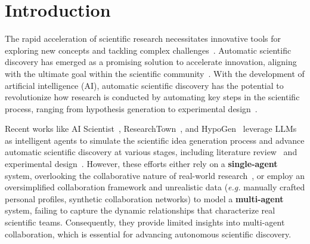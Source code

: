 \documentclass[11pt]{article}
\begin{document}
\section{Introduction}
\label{sec:intro}
The rapid acceleration of scientific research necessitates innovative tools for exploring new concepts and tackling complex challenges~\citep{park2023papers}. Automatic scientific discovery has emerged as a promising solution to accelerate innovation, aligning with the ultimate goal within the scientific community~\citep{langley1987scientific}.
With the development of artificial intelligence (AI), automatic scientific discovery has the potential to revolutionize how research is conducted by automating key steps in the scientific process, ranging from hypothesis generation to experimental design~\citep{raghu2020survey, spangler2014automated}.

Recent works like AI Scientist~\citep{lu2024ai}, ResearchTown~\cite{yu2024researchtown}, and HypoGen~\cite{qi2024large} leverage LLMs~\citep{openai,llama3} as intelligent agents to simulate the scientific idea generation process and advance automatic scientific discovery at various stages, including literature review~\citep{shi2023towards,hsu2024chime} and experimental design~\citep{wu2023autogen,huang2024crispr}. 
However, these efforts either rely on a \textbf{single-agent} system, overlooking the collaborative nature of real-world research~\citep{kayacik2019identifying, gauch2003scientific, linsey2005collaborating}, or employ an oversimplified collaboration framework and unrealistic data (\emph{e.g.} manually crafted personal profiles, synthetic collaboration networks) to model a \textbf{multi-agent} system, failing to capture the dynamic relationships that characterize real scientific teams. Consequently, they provide limited insights into multi-agent collaboration, which is essential for advancing autonomous scientific discovery.

\end{document}
